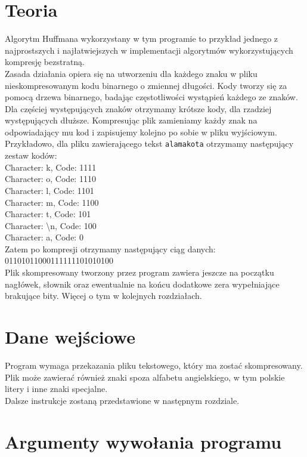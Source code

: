 \documentclass[]{article}
\begin{document}
\section{Teoria}\label{header-n281}
Algorytm Huffmana wykorzystany w tym programie to przykład jednego z najprostszych i najłatwiejszych w implementacji algorytmów wykorzystujących kompresję bezstratną.\\
Zasada działania opiera się na utworzeniu dla każdego znaku w pliku nieskompresowanym kodu binarnego o zmiennej długości. Kody tworzy się za pomocą drzewa binarnego, badając częstotliwości wystąpień każdego ze znaków. Dla częściej występujących znaków otrzymamy krótsze kody, dla rzadziej występujących dłuższe. Kompresując plik zamieniamy każdy znak na odpowiadający  mu kod i zapisujemy kolejno po sobie w pliku wyjściowym.\\
Przykładowo, dla pliku zawierającego tekst \texttt{alamakota} otrzymamy następujący zestaw kodów:\\
Character: k, Code: 1111\\
Character: o, Code: 1110\\
Character: l, Code: 1101\\
Character: m, Code: 1100\\
Character: t, Code: 101\\
Character: \textbackslash n, Code: 100\\
Character: a, Code: 0\\
Zatem po kompresji otrzymamy następujący ciąg danych: \\
01101011000111111101010100\\
Plik skompresowany tworzony przez program zawiera jeszcze na początku nagłówek, słownik oraz ewentualnie na końcu dodatkowe zera wypełniające brakujące bity. Więcej o tym w kolejnych rozdziałach.
\section{Dane wejściowe}\label{header-n233}
Program wymaga przekazania pliku tekstowego, który ma zostać skompresowany. Plik może zawierać również znaki spoza alfabetu angielskiego, w tym polskie litery i inne znaki specjalne. \\Dalsze instrukcje zostaną przedstawione w następnym rozdziale.
\section{Argumenty wywołania programu}\label{header-n256}
\end{document}
